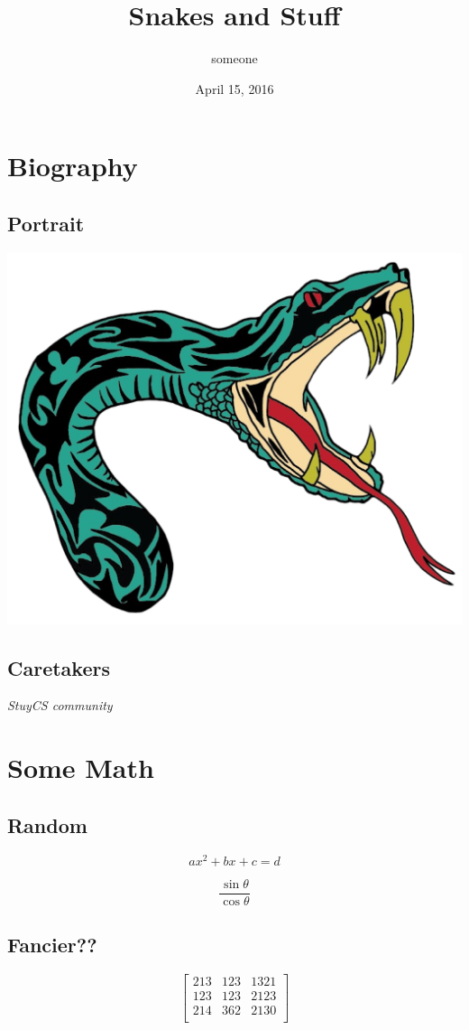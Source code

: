 \documentclass{article}
\title{Snakes and Stuff}
\author{someone}
\date{April 15, 2016}
\begin{document}
\maketitle

\section{Biography}

\subsection{Portrait}

\includegraphics[scale=0.3]{thluffy.png}

\subsection{Caretakers}

\textit{StuyCS community}

\section{Some Math}

\subsection{Random}

$$ ax^2 + bx + c = d $$

$$\frac{\sin \theta}{\cos \theta} $$

\subsection{Fancier??}

$$
\begin{bmatrix}
213 & 123 & 1321 \\
123 & 123 & 2123 \\
214 & 362 & 2130 \\
\end{bmatrix}
$$
\end{document}
